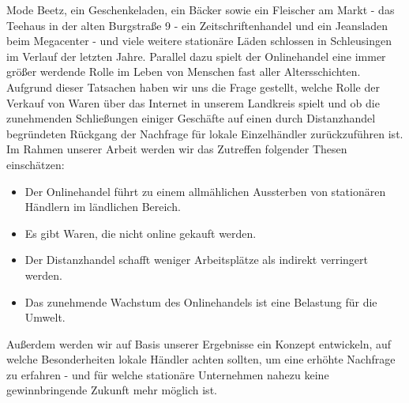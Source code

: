 



Mode Beetz, ein Geschenkeladen, ein Bäcker sowie ein Fleischer am Markt - das Teehaus in der alten Burgstraße 9 - ein Zeitschriftenhandel und ein Jeansladen beim Megacenter - und viele weitere stationäre Läden schlossen in Schleusingen im Verlauf der letzten Jahre. Parallel dazu spielt der Onlinehandel eine immer größer werdende Rolle im Leben von Menschen fast aller Altersschichten. Aufgrund dieser Tatsachen haben wir uns die Frage gestellt, welche Rolle der Verkauf von Waren über das Internet in unserem Landkreis spielt und ob die zunehmenden Schließungen einiger Geschäfte auf einen durch Distanzhandel begründeten Rückgang der Nachfrage für lokale Einzelhändler zurückzuführen ist.\\

\noindent Im Rahmen unserer Arbeit werden wir das Zutreffen folgender Thesen einschätzen:
\begin{itemize}
    \item Der Onlinehandel führt zu einem allmählichen Aussterben von stationären Händlern im ländlichen Bereich.
    
    \item Es gibt Waren, die nicht online gekauft werden.

    \item Der Distanzhandel schafft weniger Arbeitsplätze als indirekt verringert werden.
    
    \item Das zunehmende Wachstum des Onlinehandels ist eine Belastung für die Umwelt.\\
\end{itemize}

\noindent Außerdem werden wir auf Basis unserer Ergebnisse ein Konzept entwickeln, auf welche Besonderheiten lokale Händler achten sollten, um eine erhöhte Nachfrage zu erfahren - und für welche stationäre Unternehmen nahezu keine gewinnbringende Zukunft mehr möglich ist.
